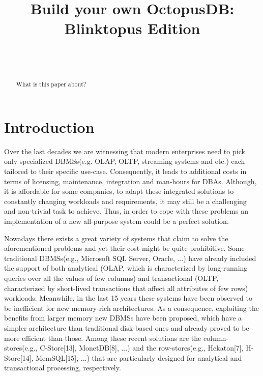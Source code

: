 \documentclass[10pt, conference, compsocconf]{IEEEtran}
\begin{document}
\title{Build your own OctopusDB: Blinktopus Edition}
\author{ \\  \\ }

\author{
}

\maketitle

\begin{abstract}
What is this paper about?
\end{abstract}

\section{Introduction}
Over the last decades we are witnessing that modern enterprises need to pick only  specialized DBMSs(e.g. OLAP, OLTP, streaming systems and etc.) each tailored to their specific use-case. Consequently, it leads to additional costs in terms of licensing, maintenance, integration and man-hours for DBAs. Although, it is affordable for some companies, to adapt these integrated solutions to constantly changing workloads and requirements, it may still be a challenging and non-trivial task to achieve. Thus, in order to cope with these problems an implementation of a new all-purpose system could be a perfect solution. 

Nowadays there exists a great variety of systems that claim to solve the aforementioned problems and yet their cost might be quite prohibitive. Some traditional DBMSs(e.g., Microsoft SQL Server, Oracle, ...) have already included the support of both analytical (OLAP, which is characterized by long-running queries over all the values of few columns) and transactional (OLTP, characterized by short-lived transactions that affect all attributes of few rows) workloads. Meanwhile, in the last 15 years these systems have been observed to be inefficient for new memory-rich architectures. As a consequence, exploiting the benefits from larger memory new DBMSs have been proposed, which have a simpler architecture than traditional disk-based ones and already proved to be more efficient than those. Among these recent solutions are the column-stores(e.g., C-Store[13], MonetDB[8], ...) and the row-stores(e.g., Hekaton[7], H-Store[14], MemSQL[15], ...) that are particularly designed for analytical and transactional processing, respectively. 
\end{document}
